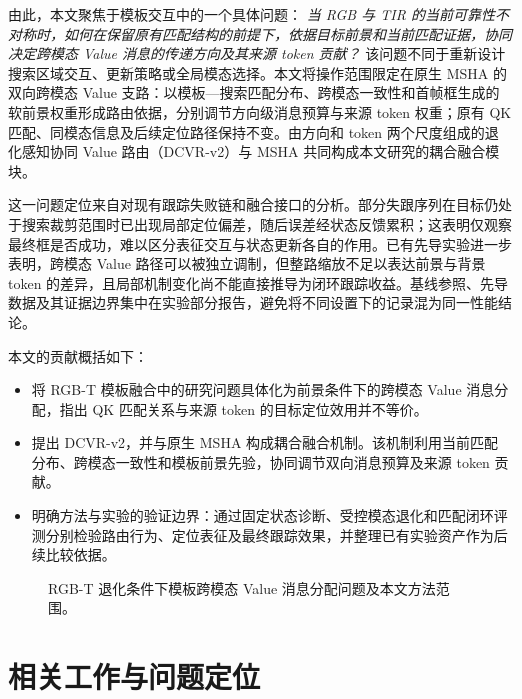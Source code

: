 \documentclass[journal]{IEEEtran}
\begin{document}
由此，本文聚焦于模板交互中的一个具体问题：
\emph{当 RGB 与 TIR 的当前可靠性不对称时，如何在保留原有匹配结构的前提下，依据目标前景和当前匹配证据，协同决定跨模态 Value 消息的传递方向及其来源 token 贡献？}
该问题不同于重新设计搜索区域交互、更新策略或全局模态选择。本文将操作范围限定在原生 MSHA 的双向跨模态 Value 支路：以模板—搜索匹配分布、跨模态一致性和首帧框生成的软前景权重形成路由依据，分别调节方向级消息预算与来源 token 权重；原有 QK 匹配、同模态信息及后续定位路径保持不变。由方向和 token 两个尺度组成的退化感知协同 Value 路由（DCVR-v2）与 MSHA 共同构成本文研究的耦合融合模块。

这一问题定位来自对现有跟踪失败链和融合接口的分析。部分失跟序列在目标仍处于搜索裁剪范围时已出现局部定位偏差，随后误差经状态反馈累积；这表明仅观察最终框是否成功，难以区分表征交互与状态更新各自的作用。已有先导实验进一步表明，跨模态 Value 路径可以被独立调制，但整路缩放不足以表达前景与背景 token 的差异，且局部机制变化尚不能直接推导为闭环跟踪收益。基线参照、先导数据及其证据边界集中在实验部分报告，避免将不同设置下的记录混为同一性能结论。

本文的贡献概括如下：
\begin{itemize}
  \item 将 RGB-T 模板融合中的研究问题具体化为前景条件下的跨模态 Value 消息分配，指出 QK 匹配关系与来源 token 的目标定位效用并不等价。
  \item 提出 DCVR-v2，并与原生 MSHA 构成耦合融合机制。该机制利用当前匹配分布、跨模态一致性和模板前景先验，协同调节双向消息预算及来源 token 贡献。
  \item 明确方法与实验的验证边界：通过固定状态诊断、受控模态退化和匹配闭环评测分别检验路由行为、定位表征及最终跟踪效果，并整理已有实验资产作为后续比较依据。
\end{itemize}

\begin{figure}[!t]
\centering
{}
\caption{RGB-T 退化条件下模板跨模态 Value 消息分配问题及本文方法范围。}
\label{fig:motivation}
\end{figure}

\section{相关工作与问题定位}
\end{document}
